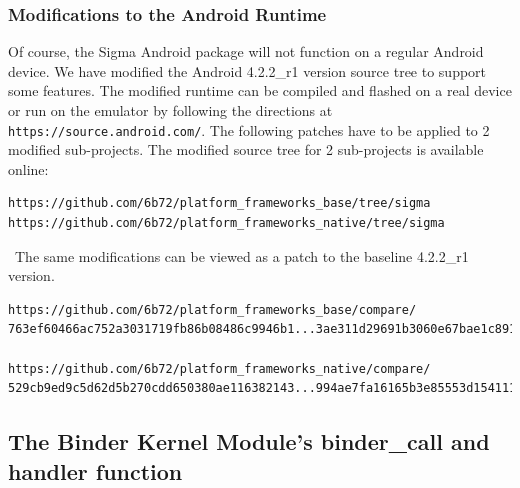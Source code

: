 \documentclass[prodmode]{acmlarge}
\begin{document}
\subsubsection{Modifications to the Android Runtime}
Of course, the Sigma Android package will not function on a regular Android device. We have modified the Android 4.2.2\_r1 version source tree to support some features. The modified runtime can be compiled and flashed on a real device or run on the emulator by following the directions at \verb|https://source.android.com/|. The following patches have to be applied to 2 modified sub-projects. The modified source tree for 2 sub-projects is available online:

\begin{Verbatim}
https://github.com/6b72/platform_frameworks_base/tree/sigma
https://github.com/6b72/platform_frameworks_native/tree/sigma
\end{Verbatim}

\noindent~The same modifications can be viewed as a patch to the baseline 4.2.2\_r1 version.
\begin{Verbatim}
https://github.com/6b72/platform_frameworks_base/compare/
763ef60466ac752a3031719fb86b08486c9946b1...3ae311d29691b3060e67bae1c891fb8fbbc1be0f

https://github.com/6b72/platform_frameworks_native/compare/
529cb9ed9c5d62d5b270cdd650380ae116382143...994ae7fa16165b3e85553d154111df0a2f5a5af3
\end{Verbatim}

\pagebreak[4]
\subsection{The Binder Kernel Module's binder\_call and handler function}
\label{app:binder_call}
\end{document}
